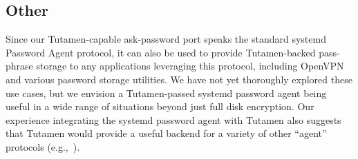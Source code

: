 \subsection{Other}

Since our Tutamen-capable ask-password port speaks the standard
systemd Password Agent protocol, it can also be used to provide
Tutamen-backed pass-phrase storage to any applications leveraging this
protocol, including OpenVPN and various password storage utilities. We
have not yet thoroughly explored these use cases, but we envision a
Tutamen-passed systemd password agent being useful in a wide range of
situations beyond just full disk encryption. Our experience
integrating the systemd password agent with Tutamen also suggests that
Tutamen would provide a useful backend for a variety of other
``agent'' protocols (e.g.,~\cite{cox2002, ylonen1996}).

